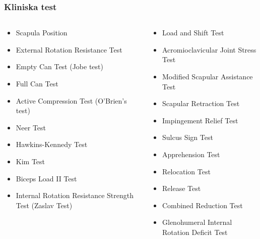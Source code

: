 \documentclass[aspectratio=169,12pt,handout,usenames,dvipsnames]{beamer}
\begin{document}
\begin{frame}
		\frametitle{Kliniska test}
	\begin{columns}
		\begin{column}{0.5\textwidth}
			\begin{itemize}
					\item Scapula Position
					\item External Rotation Resistance Test
					\item Empty Can Test (Jobe test)
					\item Full Can Test
					\item Active Compression Test (O’Brien’s test)
					\item Neer Test
					\item Hawkins-Kennedy Test
					\item Kim Test
					\item Biceps Load II Test
					\item Internal Rotation Resistance Strength Test (Zaslav Test)
			\end{itemize}
		\end{column}
		\begin{column}{0.5\textwidth}
		\begin{itemize}
				\item Load and Shift Test
				\item Acromioclavicular Joint Stress Test
				\item Modified Scapular Assistance Test
				\item Scapular Retraction Test
				\item Impingement Relief Test
				\item Sulcus Sign Test
				\item Apprehension Test
				\item Relocation Test
				\item Release Test
				\item Combined Reduction Test
				\item Glenohumeral Internal Rotation Deficit Test
		\end{itemize}
	\end{column}
	\end{columns}
\end{frame}
\end{document}
